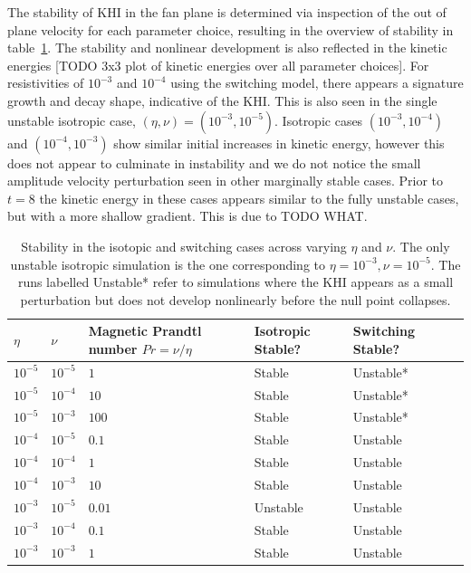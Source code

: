 The stability of KHI in the fan plane is determined via inspection of the out of plane velocity for each parameter choice, resulting in the overview of stability in table~\ref{tab:stability}. The stability and nonlinear development is also reflected in the kinetic energies [TODO 3x3 plot of kinetic energies over all parameter choices]. For resistivities of $10^{-3}$ and $10^{-4}$ using the switching model, there appears a signature growth and decay shape, indicative of the KHI. This is also seen in the single unstable isotropic case, $(\eta, \nu) = (10^{-3}, 10^{-5})$. Isotropic cases $(10^{-3}, 10^{-4})$ and $(10^{-4}, 10^{-3})$ show similar initial increases in kinetic energy, however this does not appear to culminate in instability and we do not notice the small amplitude velocity perturbation seen in other marginally stable cases. Prior to $t = 8$ the kinetic energy in these cases appears similar to the fully unstable cases, but with a more shallow gradient. This is due to TODO WHAT.

\begin{table}[]
\centering
\begin{tabular}{llllll}
$\eta$    & $\nu$    & Magnetic Prandtl number $Pr = \nu/\eta$ & Isotropic Stable? & Switching Stable? &  \\
\midrule
$10^{-5}$ & $10^{-5}$ & $1$ & Stable                 & Unstable*          &  \\
$10^{-5}$ & $10^{-4}$ & $10$ & Stable                 & Unstable*          &  \\
$10^{-5}$ & $10^{-3}$ & $100$ & Stable                 & Unstable*          &  \\
$10^{-4}$ & $10^{-5}$ & $0.1$ & Stable                 & Unstable                 &  \\
$10^{-4}$ & $10^{-4}$ & $1$ & Stable                 & Unstable                 &  \\
$10^{-4}$ & $10^{-3}$ & $10$ & Stable                 & Unstable                 &  \\
$10^{-3}$ & $10^{-5}$ & $0.01$ & Unstable                 & Unstable                 &  \\
$10^{-3}$ & $10^{-4}$ & $0.1$ & Stable                 & Unstable                 &  \\
$10^{-3}$ & $10^{-3}$ & $1$ & Stable                 & Unstable                 & 
\end{tabular}
\caption{Stability in the isotopic and switching cases across varying $\eta$ and $\nu$. The only unstable isotropic simulation is the one corresponding to $\eta = 10^{-3}, \nu = 10^{-5}$. The runs labelled Unstable* refer to simulations where the KHI appears as a small perturbation but does not develop nonlinearly before the null point collapses.}
\label{tab:stability}
\end{table}

